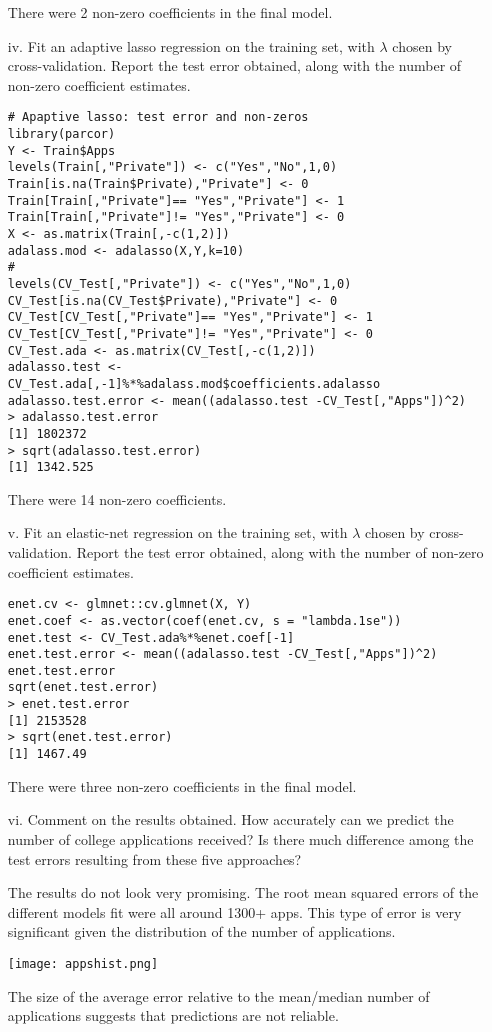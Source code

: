 \documentclass[11pt]{report}
\begin{document}
\begin{itemize}
There were 2 non-zero coefficients in the final model.

\item[iv. ] Fit an adaptive lasso regression on the training set, with $\lambda$ chosen by cross-validation. Report the test error obtained, along with the number of non-zero coefficient estimates.
\begin{verbatim}
# Apaptive lasso: test error and non-zeros
library(parcor)
Y <- Train$Apps
levels(Train[,"Private"]) <- c("Yes","No",1,0)
Train[is.na(Train$Private),"Private"] <- 0
Train[Train[,"Private"]== "Yes","Private"] <- 1
Train[Train[,"Private"]!= "Yes","Private"] <- 0
X <- as.matrix(Train[,-c(1,2)])
adalass.mod <- adalasso(X,Y,k=10)
#
levels(CV_Test[,"Private"]) <- c("Yes","No",1,0)
CV_Test[is.na(CV_Test$Private),"Private"] <- 0
CV_Test[CV_Test[,"Private"]== "Yes","Private"] <- 1
CV_Test[CV_Test[,"Private"]!= "Yes","Private"] <- 0
CV_Test.ada <- as.matrix(CV_Test[,-c(1,2)])
adalasso.test <- CV_Test.ada[,-1]%*%adalass.mod$coefficients.adalasso
adalasso.test.error <- mean((adalasso.test -CV_Test[,"Apps"])^2)
> adalasso.test.error
[1] 1802372
> sqrt(adalasso.test.error)
[1] 1342.525
\end{verbatim}

There were 14 non-zero coefficients.

\item[v. ] Fit an elastic-net regression on the training set, with $\lambda$ chosen by cross-validation. Report the test error obtained, along with the number of non-zero coefficient estimates.
\begin{verbatim}
enet.cv <- glmnet::cv.glmnet(X, Y)
enet.coef <- as.vector(coef(enet.cv, s = "lambda.1se"))
enet.test <- CV_Test.ada%*%enet.coef[-1]
enet.test.error <- mean((adalasso.test -CV_Test[,"Apps"])^2)
enet.test.error
sqrt(enet.test.error)
> enet.test.error
[1] 2153528
> sqrt(enet.test.error)
[1] 1467.49
\end{verbatim}

There were three non-zero coefficients in the final model.

\item[vi. ]  Comment on the results obtained. How accurately can we predict the number of college applications received? Is there much difference among the test errors resulting from these five approaches?

The results do not look very promising. The root mean squared errors of the different models fit were all around 1300+ apps. This type of error is very significant given the distribution of the number of applications.

\texttt{[image: appshist.png]}

The size of the average error relative to the mean/median number of applications suggests that predictions are not reliable.
\end{itemize} 
\end{document}
